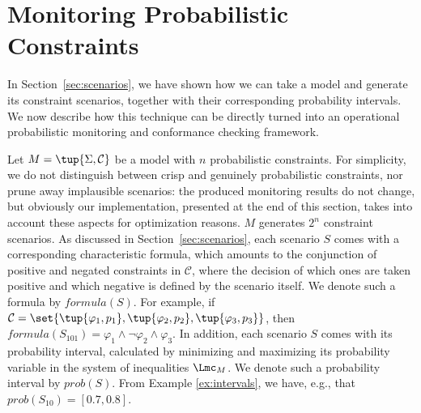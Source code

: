 \newcommand{\formula}[1]{\mathit{formula}(#1)}
\newcommand{\probability}[1]{\mathit{prob}(#1)}

\section{Monitoring Probabilistic Constraints}
\label{sec:monitoring}
In Section~\ref{sec:scenarios}, we have shown how we can take a \pdeclare model and generate its constraint scenarios, together with their corresponding probability intervals. We now describe how this technique can be directly turned into an operational probabilistic monitoring and conformance checking framework.

Let $M = \tup{\Sigma,\mathcal{C}}$ be a \pdeclare model with $n$ probabilistic constraints. For simplicity, we do not distinguish between crisp and genuinely probabilistic constraints, nor prune away implausible scenarios: the produced monitoring results do not change, but obviously our implementation, presented at the end of this section, takes into account these aspects for optimization reasons.
%
$M$ generates $2^n$ constraint scenarios. As discussed in Section~\ref{sec:scenarios}, each scenario $S$ comes with a corresponding characteristic \LTLf formula, which amounts to the conjunction of positive and negated constraints in $\mathcal{C}$, where the decision of which ones are taken positive and which negative is defined by the scenario itself. We denote such a formula by $\formula{S}$. For example, if $\mathcal{C} = \set{\tup{\varphi_1,p_1},\tup{\varphi_2,p_2},\tup{\varphi_3,p_3}}$,  then $\formula{S_{101}}=\varphi_1 \land \neg \varphi_2 \land \varphi_3$.
%
In addition, each scenario $S$ comes with its probability interval, calculated by minimizing and maximizing its probability variable in the system of inequalities $\Lmc_M$. We denote such a probability interval by $\probability{S}$. From Example \ref{ex:intervals}, we have, e.g., that $\probability{S_{10}}= [0.7,0.8]$.

